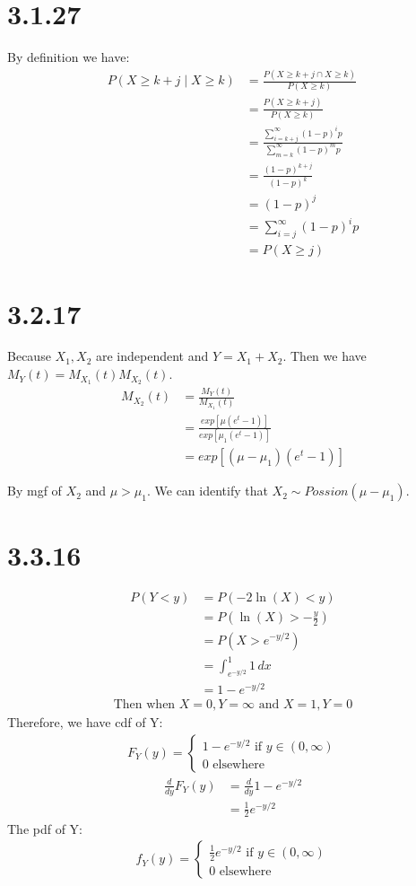 \documentclass{article}
\begin{document}
\section*{3.1.27}
By definition we have:
\begin{align*}
    P(X \geq k+j \mid X \geq k) &= \frac{P(X \geq k+j \cap X \geq k)}{P(X \geq k)}\\
    &= \frac{P(X \geq k+j)}{P(X \geq k)}\\
    &= \frac{\sum_{i=k+j}^{\infty} (1-p)^{i}p}{\sum_{m=k}^{\infty} (1-p)^{m}p}\\
    &= \frac{(1-p)^{k+j}}{(1-p)^{k}}\\
    &= (1-p)^j\\
    &=\sum_{i=j}^{\infty} (1-p)^{i}p\\
    &= P(X \geq j)
\end{align*}
\section*{3.2.17}
Because \(X_1,X_2\) are independent and \(Y = X_1 + X_2\). Then we have 
\(M_Y(t) = M_{X_1}(t)M_{X_2}(t)\).
\begin{align*}
M_{X_2}(t) &= \frac{M_Y(t)}{M_{X_1}(t)}\\
&= \frac{exp[\mu (e^t-1)]}{exp[\mu_1 (e^t-1)]}\\
&= exp[(\mu - \mu_1)(e^t-1)]
\end{align*}

\noindent
By mgf of \(X_2\) and \(\mu > \mu_1\). We can identify that \(X_2 \sim Possion(\mu - \mu_1)\).
\section*{3.3.16}
\begin{align*}
P(Y<y) &= P(-2\ln(X)<y)\\
&=P(\ln(X)>-\frac{y}{2})\\
&=P(X>e^{-y/2})\\
&=\int_{e^{-y/2}}^{1} 1 \, dx\\
&=1-e^{-y/2}
\end{align*}
\begin{align*}
\text{Then when } X=0, Y= \infty \text{ and } X=1, Y=0
\end{align*}
Therefore, we have cdf of Y:
\begin{align*}
F_Y(y)=
\begin{cases}
1-e^{-y/2} \text{  if  } y \in (0, \infty)\\
0 \text{  elsewhere}
\end{cases}
\end{align*}
\begin{align*}
\frac{d}{dy}F_Y(y)&=\frac{d}{dy}1-e^{-y/2}\\
&=\frac{1}{2}e^{-y/2}
\end{align*}
The pdf of Y:
\begin{align*}
f_Y(y)=
\begin{cases}
\frac{1}{2}e^{-y/2} \text{  if  } y \in (0, \infty)\\
0 \text{  elsewhere}
\end{cases}
\end{align*}
\end{document}
